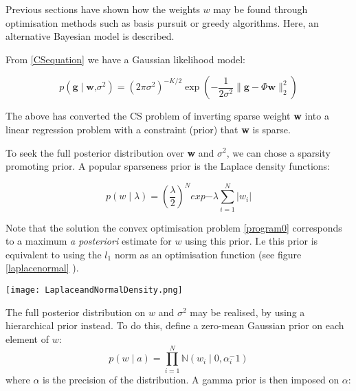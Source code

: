 Previous sections have shown how the weights \(w\) may be found through optimisation methods such as basis pursuit or greedy algorithms. Here, an alternative Bayesian model is described.

From \ref{CSequation} we have a Gaussian likelihood model: 

\begin{equation}
p \left( \textbf{g} \mid \textbf{w}\text{,} \sigma^2 \right) = (2 \pi \sigma^2)^{-K/2} \exp{\left(- \frac{1}{2 \sigma^2} \|\textbf{g} - \Phi	\textbf{w}\|_{2}^{2} \right)} 
\end{equation}

The above has converted the CS problem of inverting sparse weight \textbf{w} into a linear regression problem with a constraint (prior) that \textbf{w} is sparse. 

To seek the full posterior distribution over \textbf{w} and \( \sigma^2 \), we can chose a sparsity promoting prior. A popular sparseness prior is the Laplace density functions:

\begin{equation}
p\left(w\mid\lambda\right) = \left(\frac{\lambda}{2}\right)^N exp{-\lambda \sum_{i=1}^{N} |w_i|}
\end{equation}

Note that the solution the convex optimisation problem \ref{program0} corresponds to a maximum \textit{a posteriori} estimate for \(w\) using this prior. I.e this prior is equivalent to using the \(l_1\) norm as an optimisation function (see figure \ref{laplacenormal} \cite{Tibshirani1996}).

\begin{figure*}[h]
\centering
\texttt{[image: LaplaceandNormalDensity.png]}
\caption{The Laplace (\(l_1\)-norm, bold line) and Normal (\(l_2\)-norm, dotted line) densities. Note that the Laplace density is sparsity promoting as it penalises solutions away from zero more than the Gaussian density. \cite{Tibshirani1996}}
\label{laplacenormal}
\end{figure*}

The full posterior distribution on \(w\) and \(\sigma^2\) may be realised, by using a hierarchical prior instead. To do this, define a zero-mean Gaussian prior on each element of \(w\):
%
\begin{equation}
p\left(w\mid a\right) = \prod_{i=1}^{N}\mathbb{N}\left(w_i\mid 0, \alpha_{i}^-1\right)
\end{equation}
%
where \(\alpha\) is the precision of the distribution. A gamma prior is then imposed on \(\alpha\):

